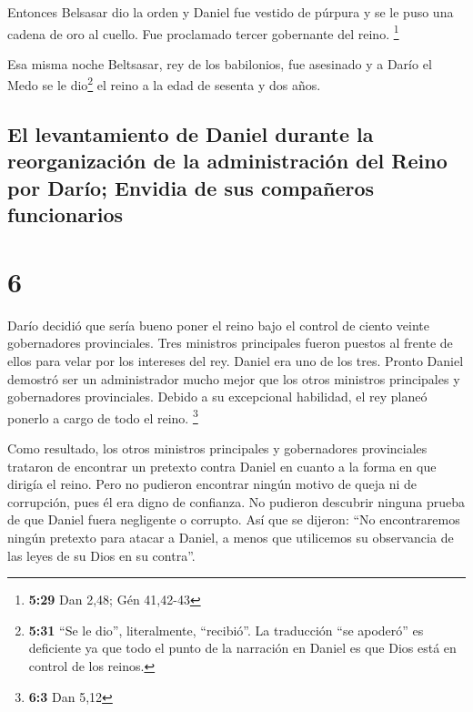  Entonces Belsasar dio la orden y Daniel fue vestido de
púrpura y se le puso una cadena de oro al cuello. Fue proclamado tercer
gobernante del reino. \footnote{\textbf{5:29} Dan 2,48; Gén 41,42-43}

 Esa misma noche Beltsasar, rey de los babilonios, fue
asesinado  y a Darío el Medo se le dio\footnote{\textbf{5:31}
  ``Se le dio'', literalmente, ``recibió''. La traducción ``se apoderó''
  es deficiente ya que todo el punto de la narración en Daniel es que
  Dios está en control de los reinos.} el reino a la edad de sesenta y
dos años.

\hypertarget{el-levantamiento-de-daniel-durante-la-reorganizaciuxf3n-de-la-administraciuxf3n-del-reino-por-daruxedo-envidia-de-sus-compauxf1eros-funcionarios}{%
\subsection{El levantamiento de Daniel durante la reorganización de la
administración del Reino por Darío; Envidia de sus compañeros
funcionarios}\label{el-levantamiento-de-daniel-durante-la-reorganizaciuxf3n-de-la-administraciuxf3n-del-reino-por-daruxedo-envidia-de-sus-compauxf1eros-funcionarios}}

\hypertarget{section-5}{%
\section{6}\label{section-5}}

 Darío decidió que sería bueno poner el reino bajo el
control de ciento veinte gobernadores provinciales.  Tres
ministros principales fueron puestos al frente de ellos para velar por
los intereses del rey. Daniel era uno de los tres.  Pronto
Daniel demostró ser un administrador mucho mejor que los otros ministros
principales y gobernadores provinciales. Debido a su excepcional
habilidad, el rey planeó ponerlo a cargo de todo el reino. \footnote{\textbf{6:3}
  Dan 5,12}

 Como resultado, los otros ministros principales y
gobernadores provinciales trataron de encontrar un pretexto contra
Daniel en cuanto a la forma en que dirigía el reino. Pero no pudieron
encontrar ningún motivo de queja ni de corrupción, pues él era digno de
confianza. No pudieron descubrir ninguna prueba de que Daniel fuera
negligente o corrupto.  Así que se dijeron: ``No
encontraremos ningún pretexto para atacar a Daniel, a menos que
utilicemos su observancia de las leyes de su Dios en su contra''.

